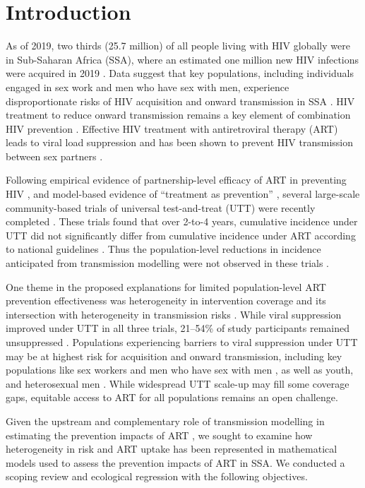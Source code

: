 \section{Introduction}
\label{s:intro}
As of 2019, two thirds (25.7 million) of all people living with HIV globally
were in Sub-Saharan Africa (SSA), where
an estimated one million new HIV infections were acquired in 2019 \cite{AIDSinfo}.
Data suggest that key populations, including individuals engaged in sex work and men who have sex with men,
experience disproportionate risks of HIV acquisition and onward transmission in SSA
\cite{Baral2012,Beyrer2012,Mishra2012,Boily2015}.
HIV treatment to reduce onward transmission remains a key element of combination HIV prevention \cite{WHO2016ART}.
Effective HIV treatment with antiretroviral therapy (ART) leads to viral load suppression
and has been shown to prevent HIV transmission between sex partners \cite{Lundgren2015,Danel2015,Cohen2016}.
\par
Following empirical evidence of partnership-level efficacy of ART
in preventing HIV \cite{Lundgren2015,Danel2015,Cohen2016},
and model-based evidence of ``treatment as prevention'' \cite{Granich2009,Eaton2012,Cori2014},
several large-scale community-based trials of universal test-and-treat (UTT)
were recently completed \cite{Iwuji2018,Havlir2019,Hayes2019}.
These trials found that over 2-to-4 years,
cumulative incidence under UTT did not significantly differ from
cumulative incidence under ART according to national guidelines \cite{Havlir2019,Hayes2019,Iwuji2018}.
Thus the population-level reductions in incidence anticipated from transmission modelling
were not observed in these trials \cite{Baral2019,Havlir2020}.
\par
One theme in the proposed explanations for limited population-level ART prevention effectiveness
was heterogeneity in intervention coverage and its intersection with
heterogeneity in transmission risks \cite{AbdoolKarim2019,Baral2019}.
While viral suppression improved under UTT in all three trials,
21--54\% of study participants remained unsuppressed \cite{Iwuji2018,Havlir2019,Hayes2019}.
Populations experiencing barriers to viral suppression under UTT
may be at highest risk for acquisition and onward transmission, including key populations like
sex workers and men who have sex with men \cite{Hakim2018,Nyato2019},
as well as youth, and heterosexual men \cite{Green2020,Quinn2019}.
While widespread UTT scale-up may fill some coverage gaps,
equitable access to ART for all populations remains an open challenge.
\par
Given the upstream and complementary role of transmission modelling
in estimating the prevention impacts of ART \cite{Eaton2012,Delva2012},
we sought to examine how heterogeneity in risk and ART uptake has been represented
in mathematical models used to assess the prevention impacts of ART in SSA.
We conducted a scoping review and ecological regression with the following objectives.

